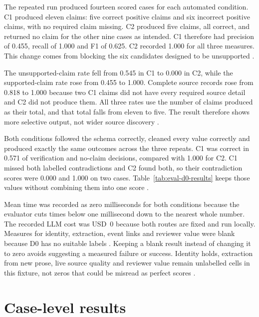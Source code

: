 

The repeated run produced fourteen scored cases for each automated condition. C1 produced eleven
claims: five correct positive claims and six incorrect positive claims, with no required claim
missing. C2 produced five claims, all correct, and returned no claim for the other nine cases as
intended. C1 therefore had precision of 0.455, recall of 1.000 and F1 of 0.625. C2 recorded 1.000 for
all three measures. This change comes from blocking the six candidates designed to be unsupported
\citep{gao2023alce,gao2023rarr}.

The unsupported-claim rate fell from 0.545 in C1 to 0.000 in C2, while the supported-claim rate rose
from 0.455 to 1.000. Complete source records rose from 0.818 to 1.000 because two C1 claims did not
have every required source detail and C2 did not produce them. All three rates use the number of
claims produced as their total, and that total falls from eleven to five. The result therefore shows
more selective output, not wider source discovery \citep{gao2023alce,gebru2021datasheets}.

Both conditions followed the schema correctly, cleaned every value correctly and produced exactly
the same outcomes across the three repeats. C1 was correct in 0.571 of verification and no-claim
decisions, compared with 1.000 for C2. C1 missed both labelled contradictions and C2 found both, so
their contradiction scores were 0.000 and 1.000 on two cases.
Table~\ref{tab:eval-d0-results} keeps those values without combining them into one score
\citep{nikiforova2020quality,pineau2021reproducibility}.

Mean time was recorded as zero milliseconds for both conditions because the evaluator cuts times
below one millisecond down to the nearest whole number. The recorded LLM cost was USD~0 because both
routes are fixed and run locally. Measures for identity, extraction, event links and reviewer value
were blank because D0 has no suitable labels \citep{gebru2021datasheets,nist2023airmf}. Keeping a
blank result instead of changing it to zero avoids suggesting a measured failure or success. Identity
holds, extraction from new prose, live source quality and reviewer value remain unlabelled cells in
this fixture, not zeros that could be misread as perfect scores
\citep{nikiforova2020quality,gebru2021datasheets}.



\section{Case-level results}

